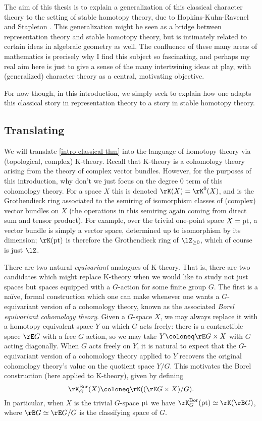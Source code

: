 The aim of this thesis is to explain a generalization of this
classical character theory to the setting of stable homotopy theory,
due to Hopkins-Kuhn-Ravenel \cite{hkr-char} and Stapleton
\cite{stapleton-tgcm}. This generalization might be seen as a bridge
between representation theory and stable homotopy theory, but is
intimately related to certain ideas in algebraic geometry as well. The
confluence of these many areas of mathematics is precisely why I find
this subject so fascinating, and perhaps my real aim here is just to
give a sense of the many intertwining ideas at play, with
(generalized) character theory as a central, motivating objective.

For now though, in this introduction, we simply seek to explain how
one adapts this classical story in representation theory to a story in
stable homotopy theory.


\subsection{Translating}
\label{intro-trans}

We will translate \cref{intro-classical-thm} into the language of
homotopy theory via (topological, complex) K-theory. Recall that
K-theory is a cohomology theory arising from the theory of complex
vector bundles. However, for the purposes of this introduction, why
don't we just focus on the degree $0$ term of this cohomology
theory. For a space $X$ this is denoted $\rK(X) = \rK^0(X)$, and is
the Grothendieck ring associated to the semiring of isomorphism
classes of (complex) vector bundles on $X$ (the operations in this
semiring again coming from direct sum and tensor product). For
example, over the trivial one-point space $X = \mathrm{pt}$, a vector bundle
is simply a vector space, determined up to isomorphism by its
dimension; $\rK(\pt)$ is therefore the Grothendieck ring of
$\lZ_{\ge 0}$, which of course is just $\lZ$.

There are two natural \emph{equivariant} analogues of K-theory. That
is, there are two candidates which might replace K-theory when we
would like to study not just spaces but spaces equipped with a
$G$-action for some finite group $G$. The first is a na\"ive, formal
construction which one can make whenever one wants a $G$-equivariant
version of a cohomology theory, known as the associated \emph{Borel
  equivariant cohomology theory}. Given a $G$-space $X$, we may always
replace it with a homotopy equivalent space $Y$ on which $G$ acts
freely: there is a contractible space $\rE G$ with a free $G$ action,
so we may take $Y \ce \rE G \times X$ with $G$ acting diagonally. When
$G$ acts freely on $Y$, it is natural to expect that the
$G$-equivariant version of a cohomology theory applied to $Y$ recovers
the original cohomology theory's value on the quotient space
$Y/G$. This motivates the Borel construction (here applied to
K-theory), given by defining
\[
\rK^\Bor_G(X) \ce \rK((\rE G \times X)/G).
\]
In particular, when $X$ is the trivial $G$-space $\mathrm{pt}$ we have
$\rK^\Bor_G(\pt) \iso \rK(\rB G)$, where $\rB G \iso \rE G / G$ is the
classifying space of $G$.

